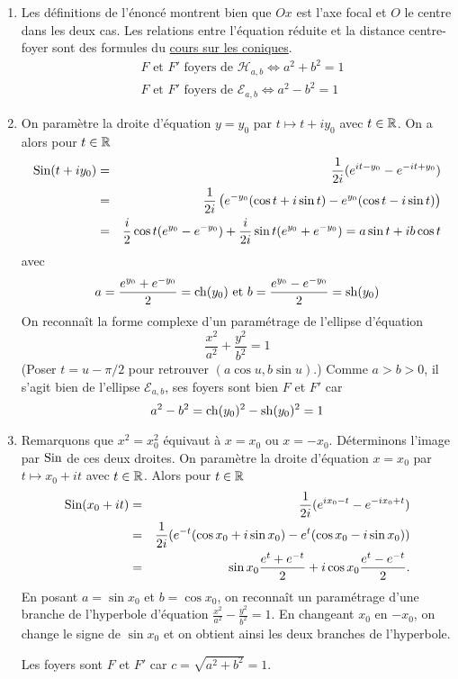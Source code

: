 \begin{enumerate}
 \item Les définitions de l'énoncé montrent bien que $Ox$ est l'axe focal et $O$ le centre dans les deux cas. Les relations entre l'équation réduite et la distance centre-foyer sont des formules du \href{http:/back.maquisdoc.net/data/coursnicolair/C4893.pdf}{cours sur les coniques}.
\begin{align*}
 &F \text{ et } F' \text{ foyers de } \mathcal H_{a,b} \Leftrightarrow  a^2 + b^2 = 1 \\ 
&F \text{ et } F' \text{ foyers de } \mathcal E_{a,b} \Leftrightarrow  a^2 - b^2 = 1 
\end{align*}

\item
On paramètre la droite d'équation $y=y_0$ par $t \mapsto t+ iy_0$ avec $t\in \mathbb{R}$. On a alors pour $t\in\mathbb{R}$
\begin{eqnarray*}
\textnormal{Sin} (t+iy_0) &=& \frac1{2i} (e^{it-y_0} - e^{-it +y_0} ) \\
&=& \frac1{2i} \left( e^{-y_0} (\cos t + i\sin t ) - e^{y_0} (\cos t - i \sin t) \right) \\
&=& \frac{i}2 \cos t (e^{y_0} - e^{-y_0}) + \frac{i}{2i} \sin t (e^{y_0} + e^{-y_0} ) = a\sin t +i b \cos t
\end{eqnarray*}
avec
\begin{displaymath}
 a = \frac{e^{y_0} + e^{-y_0}}{2}=\operatorname{ch}(y_0) \text{ et } b = \frac{e^{y_0} - e^{-y_0}}2 = \operatorname{sh}(y_0)
\end{displaymath}
On reconna\^it la forme complexe d'un paramétrage de l'ellipse d'équation 
\begin{displaymath}
 \frac{x^2}{a^2} + \frac{y^2}{b^2} =1
\end{displaymath}
(Poser $t = u-\pi/2$ pour retrouver $(a \cos u, b \sin u)$.) Comme $a>b>0$, il s'agit bien de l'ellipse $\mathcal E _{a,b}$, ses foyers sont bien $F$ et $F'$ car
\begin{displaymath}
 a^2 - b^2 = \operatorname{ch}(y_0)^2 - \operatorname{sh}(y_0)^2 = 1
\end{displaymath}

\item 
Remarquons que $x^2=x_0^2$ équivaut \`a $x=x_0$ ou $x = -x_0$. Déterminons l'image par $\textnormal{Sin}$ de ces deux droites. On param\`etre la droite d'équation $x=x_0$ par $t \mapsto x_0 + it$ avec $t\in \mathbb{R}$. Alors pour $t\in \mathbb{R}$
\begin{eqnarray*}
\textnormal{Sin} (x_0 + it) &=& \frac1{2i} (e^{ix_0 - t } - e^{-ix_0 + t}) \\
&=& \frac1{2i} (e^{-t} (\cos x_0 + i \sin x_0)
-e^t (\cos x_0 - i \sin x_0)) \\
&=& \sin x_0 \frac{e^t + e^{-t}}2 + i \cos x_0 \frac{e^{t} - e^{-t}}2. 
\end{eqnarray*}
En posant $a = \sin x_0$ et $b = \cos x_0$, on reconna\^it un paramétrage d'une branche de l'hyperbole d'équation $\frac{x^2}{a^2}- \frac{y^2}{b^2} = 1$. En changeant $x_0$ en $-x_0$, on change le signe de $\sin x_0$ et on obtient ainsi les deux branches de l'hyperbole. 
\par
Les foyers sont $F$ et $F'$ car $c = \sqrt{a^2+b^2} = 1$.   


\end{enumerate}
